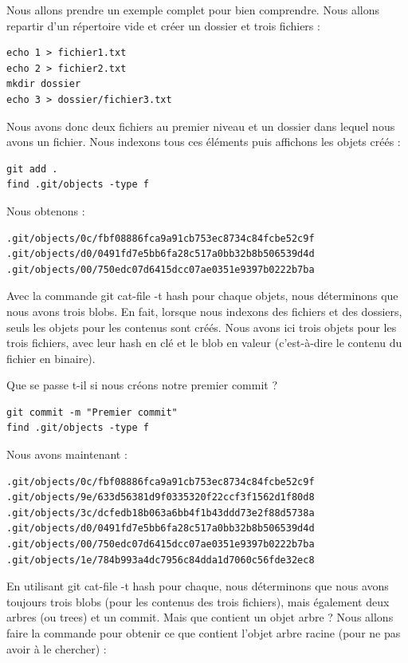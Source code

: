 \documentclass{article}
\begin{document}
Nous allons prendre un exemple complet pour bien comprendre. Nous allons repartir d'un répertoire vide et créer un dossier et trois fichiers :
\begin{verbatim}
echo 1 > fichier1.txt
echo 2 > fichier2.txt
mkdir dossier
echo 3 > dossier/fichier3.txt
\end{verbatim}

Nous avons donc deux fichiers au premier niveau et un dossier dans lequel nous avons un fichier. Nous indexons tous ces éléments puis affichons les objets créés :


\begin{verbatim}
git add .
find .git/objects -type f
\end{verbatim}

Nous obtenons :
\begin{verbatim}
.git/objects/0c/fbf08886fca9a91cb753ec8734c84fcbe52c9f
.git/objects/d0/0491fd7e5bb6fa28c517a0bb32b8b506539d4d
.git/objects/00/750edc07d6415dcc07ae0351e9397b0222b7ba
\end{verbatim}
Avec la commande {\color{blue}git cat-file -t hash} pour chaque objets, nous déterminons que nous avons trois {\color{blue}blobs}. En fait, lorsque nous indexons des fichiers et des dossiers, seuls les objets pour les contenus sont créés. Nous avons ici trois objets pour les trois fichiers, avec leur {\color{blue}hash} en clé et le {\color{blue}blob} en valeur (c'est-à-dire le contenu du fichier en binaire).

Que se passe t-il si nous créons notre premier {\color{blue}commit} ?

\begin{verbatim}
git commit -m "Premier commit"
find .git/objects -type f
\end{verbatim}
Nous avons maintenant :
\begin{verbatim}
.git/objects/0c/fbf08886fca9a91cb753ec8734c84fcbe52c9f
.git/objects/9e/633d56381d9f0335320f22ccf3f1562d1f80d8
.git/objects/3c/dcfedb18b063a6bb4f1b43ddd73e2f88d5738a
.git/objects/d0/0491fd7e5bb6fa28c517a0bb32b8b506539d4d
.git/objects/00/750edc07d6415dcc07ae0351e9397b0222b7ba
.git/objects/1e/784b993a4dc7956c84dda1d7060c56fde32ec8
\end{verbatim}

En utilisant {\color{blue}git cat-file -t hash} pour chaque, nous déterminons que nous avons toujours trois {\color{blue}blobs} (pour les contenus des trois fichiers), mais également deux arbres (ou {\color{blue}trees}) et un {\color{blue}commit}. Mais que contient un objet arbre ? Nous allons faire la commande pour obtenir ce que contient l'objet arbre racine (pour ne pas avoir à le chercher) :
\end{document}
